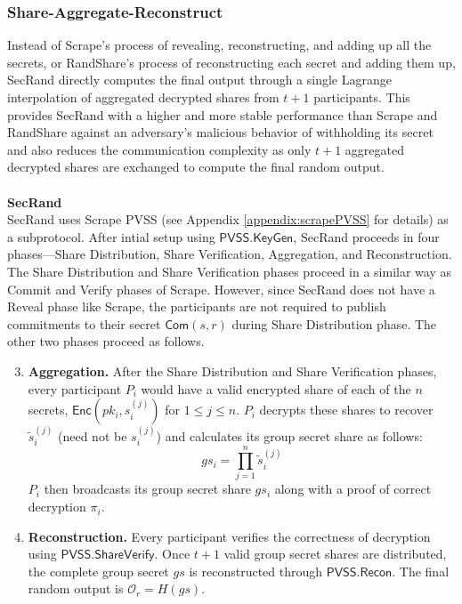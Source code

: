 \documentclass[letterpaper,twocolumn,10pt]{article}
\theoremstyle{definition}
\theoremstyle{remark}
\begin{document}
\subsubsection{Share-Aggregate-Reconstruct}
Instead of Scrape's process of revealing, reconstructing, and adding up all the secrets, or RandShare's process of reconstructing each secret and adding them up, SecRand \cite{guo2020secRand} directly computes the final output through a single Lagrange interpolation of aggregated decrypted shares from $t + 1$ participants. This provides SecRand with a higher and more stable performance than Scrape and RandShare against an adversary's malicious behavior of withholding its secret and also reduces the communication complexity as only $t + 1$ aggregated decrypted shares are exchanged to compute the final random output.\\\\
\textbf{SecRand}\\
SecRand uses Scrape PVSS (see Appendix \ref{appendix:scrapePVSS} for details) as a subprotocol. After intial setup using $\mathsf{PVSS.KeyGen}$, SecRand proceeds in four phases---Share Distribution, Share Verification, Aggregation, and Reconstruction. The Share Distribution and Share Verification phases proceed in a similar way as Commit and Verify phases of Scrape. However, since SecRand does not have a Reveal phase like Scrape, the participants are not required to publish commitments to their secret $\mathsf{Com}(s, r)$ during Share Distribution phase. The other two phases proceed as follows.
\begin{enumerate}
    \setcounter{enumi}{2}
    \item \textbf{Aggregation.} After the Share Distribution and Share Verification phases, every participant $P_i$ would have a valid encrypted share of each of the $n$ secrets, $\mathsf{Enc}(pk_i, s_i^{(j)})$ for $1 \le j \le n$. $P_i$ decrypts these shares to recover $\tilde{s}_i^{(j)}$ (need not be $s_i^{(j)}$) and calculates its group secret share as follows: 
    $$ gs_i = \prod_{j=1}^{n}\tilde{s}_i^{(j)} $$
    $P_i$ then broadcasts its group secret share $gs_i$ along with a proof of correct decryption $\pi_i$.
    \item \textbf{Reconstruction.} Every participant verifies the correctness of decryption using $\mathsf{PVSS.ShareVerify}$. Once $t+1$ valid group secret shares are distributed, the complete group secret $gs$ is reconstructed through $\mathsf{PVSS.Recon}$. The final random output is $\mathcal{O}_r = H(gs)$.
\end{enumerate}
\end{document}
